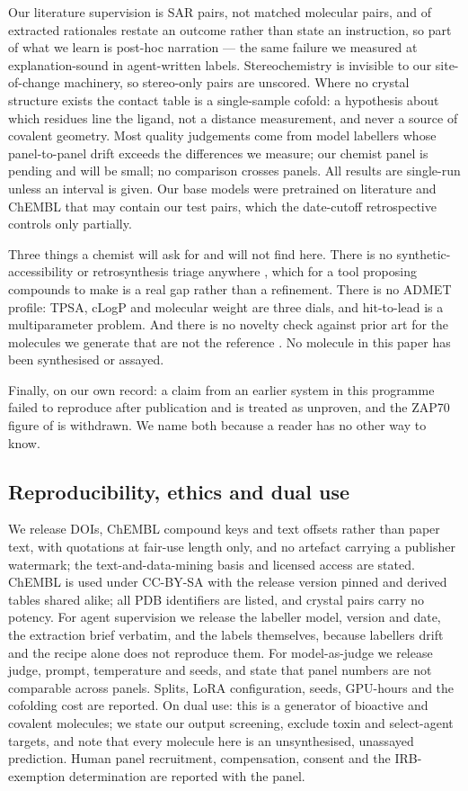 Our literature supervision is SAR pairs, not matched molecular pairs, and  of extracted
rationales restate an outcome rather than state an instruction, so part of what we learn is post-hoc
narration --- the same failure we measured at explanation-sound  in agent-written labels.
Stereochemistry is invisible to our site-of-change machinery, so stereo-only pairs are unscored.
Where no crystal structure exists the contact table is a single-sample cofold: a hypothesis about
which residues line the ligand, not a distance measurement, and never a source of covalent geometry.
Most quality judgements come from model labellers whose panel-to-panel drift exceeds the differences
we measure; our chemist panel is pending and will be small; no comparison crosses panels. All results
are single-run unless an interval is given. Our base models were pretrained on literature and ChEMBL
that may contain our test pairs, which the date-cutoff retrospective controls only partially.

Three things a chemist will ask for and will not find here. There is no synthetic-accessibility or
retrosynthesis triage anywhere , which for a tool proposing compounds to
make is a real gap rather than a refinement. There is no ADMET profile: TPSA, cLogP and molecular
weight are three dials, and hit-to-lead is a multiparameter problem. And there is no novelty check
against prior art for the molecules we generate that are not the reference
. No molecule in this paper has been synthesised or assayed.

Finally, on our own record: a claim from an earlier system in this programme failed to reproduce
after publication and is treated as unproven, and the ZAP70 figure of  is withdrawn. We
name both because a reader has no other way to know.

\subsection{Reproducibility, ethics and dual use}

We release DOIs, ChEMBL compound keys and text offsets rather than paper text, with quotations at
fair-use length only, and no artefact carrying a publisher watermark; the text-and-data-mining basis
and licensed access are stated. ChEMBL is used under CC-BY-SA with the release version pinned and
derived tables shared alike; all PDB identifiers are listed, and crystal pairs carry no potency. For
agent supervision we release the labeller model, version and date, the extraction brief verbatim, and
the labels themselves, because labellers drift and the recipe alone does not reproduce them. For
model-as-judge we release judge, prompt, temperature and seeds, and state that panel numbers are not
comparable across panels. Splits, LoRA configuration, seeds, GPU-hours and the cofolding cost are
reported. On dual use: this is a generator of bioactive and covalent molecules; we state our output
screening, exclude toxin and select-agent targets, and note that every molecule here is an
unsynthesised, unassayed prediction. Human panel recruitment, compensation, consent and the
IRB-exemption determination are reported with the panel.

